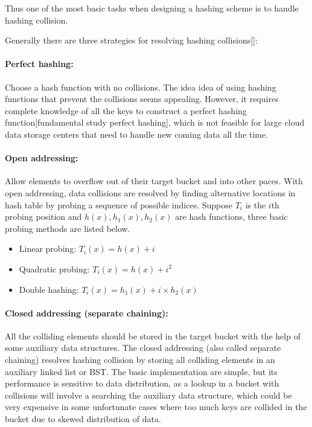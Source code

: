 \documentclass[runningheads]{llncs}
\begin{document}
Thus one of the most basic tasks when designing a hashing scheme is to handle hashing collision.

Generally there are three strategies for resolving hashing collisions[]:

\paragraph{\textbf{Perfect hashing:}} Choose a hash function with no collisions. The idea idea of using hashing functions that prevent the collisions seems appealing. However, it requires complete knowledge of all the keys to construct a perfect hashing function[fundamental study perfect hashing], which is not feasible for large cloud data storage centers that need to handle new coming data all the time.

\paragraph{\textbf{Open addressing:}} Allow elements to overflow out of their target bucket and into other paces. With open addressing, data collisions are resolved by finding alternative locations in hash table by probing a sequence of possible indices. Suppose $T_i$ is the $i$th probing position and $h(x), h_1(x), h_2(x)$ are hash functions, three basic probing methods are listed below.
\begin{itemize}
    \item Linear probing: $T_i(x)=h(x)+i$
    \item Quadratic probing: $T_i(x)=h(x)+i^2$
    \item Double hashing: $T_i(x)=h_1(x)+i\times h_2(x)$
\end{itemize}

\paragraph{\textbf{Closed addressing (separate chaining):}} All the colliding elements should be stored in the target bucket with the help of some auxiliary data structures. The closed addressing (also called separate chaining) resolves hashing collision by storing all colliding elements in an auxiliary linked list or BST. The basic implementation are simple, but its performance is sensitive to data distribution, as a lookup in a bucket with collisions will involve a searching the auxiliary data structure, which could be very expensive in some unfortunate cases where too much keys are collided in the bucket due to skewed distribution of data.\\
\end{document}
